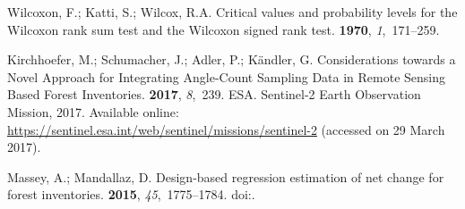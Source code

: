 \documentclass[remotesensing,article,accept,moreauthors,pdftex,10pt,a4paper]{Definitions/mdpi}
\begin{document}
\begin{thebibliography}{999}
Wilcoxon, F.; Katti, S.; Wilcox, R.A.
\newblock Critical values and probability levels for the Wilcoxon rank sum test
  and the Wilcoxon signed rank test.
 {\bf 1970}, {\em
  1},~171--259.

Kirchhoefer, M.; Schumacher, J.; Adler, P.; K{\"a}ndler, G.
\newblock Considerations towards a Novel Approach for Integrating Angle-Count
  Sampling Data in Remote Sensing Based Forest Inventories.
 {\bf 2017}, {\em 8},~239.
\newpage
{}
ESA.
\newblock Sentinel-2 Earth Observation Mission, 2017. Available online: \url{https://sentinel.esa.int/web/sentinel/missions/sentinel-2} (accessed on 29 March 2017).
 

Massey, A.; Mandallaz, D.
\newblock Design-based regression estimation of net change for forest
  inventories.
 {\bf 2015}, {\em
  45},~1775--1784.
\newblock
  doi:{\href{https://doi.org/10.1139/cjfr-2015-0266}{}}.

\end{thebibliography}
\end{document}
